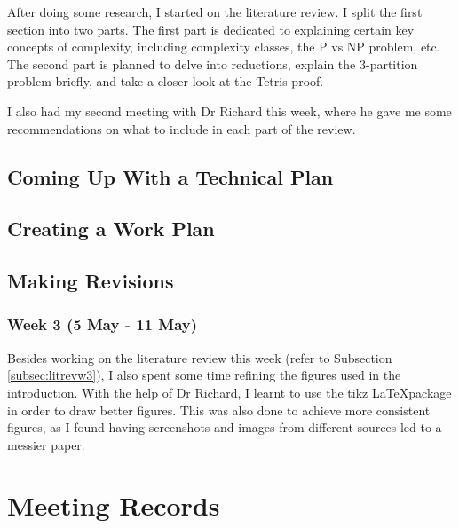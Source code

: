 \documentclass[a4paper, 12pt]{extreport}
\begin{document}
				After doing some research, I started on the literature review. I split the first section into two parts. The first part is dedicated to explaining certain key concepts of complexity, including complexity classes, the P vs NP problem, etc. The second part is planned to delve into reductions, explain the 3-partition problem briefly, and take a closer look at the Tetris proof.
				
				I also had my second meeting with Dr Richard this week, where he gave me some recommendations on what to include in each part of the review.
		
		\section{Coming Up With a Technical Plan}
		
		\section{Creating a Work Plan}
		
		\section{Making Revisions}
		
			\subsection{Week 3 (5 May - 11 May)}\label{subsec:revw3}
				
				Besides working on the literature review this week (refer to Subsection \ref{subsec:litrevw3}), I also spent some time refining the figures used in the introduction. With the help of Dr Richard, I learnt to use the tikz \LaTeX package in order to draw better figures. This was also done to achieve more consistent figures, as I found having screenshots and images from different sources led to a messier paper.
		
	\nocite{*}
	\printbibliography[heading={bibnumbered}, title={Bibliography}]
	
	\chapter{Meeting Records}
		
		
		
		
		
		
		
\end{document}
